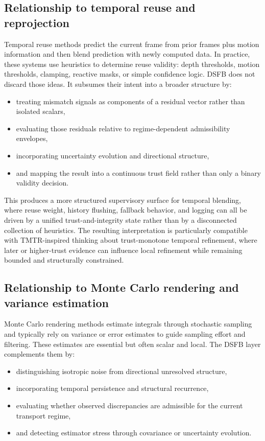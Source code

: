 \documentclass[11pt]{article}
\theoremstyle{definition}
\theoremstyle{plain}
\begin{document}

\subsection{Relationship to temporal reuse and reprojection}

Temporal reuse methods predict the current frame from prior frames plus motion information and then blend prediction with newly computed data. In practice, these systems use heuristics to determine reuse validity: depth thresholds, motion thresholds, clamping, reactive masks, or simple confidence logic. DSFB does not discard those ideas. It subsumes their intent into a broader structure by:
\begin{itemize}[leftmargin=1.5em]
    \item treating mismatch signals as components of a residual vector rather than isolated scalars,
    \item evaluating those residuals relative to regime-dependent admissibility envelopes,
    \item incorporating uncertainty evolution and directional structure,
    \item and mapping the result into a continuous trust field rather than only a binary validity decision.
\end{itemize}

This produces a more structured supervisory surface for temporal blending, where reuse weight, history flushing, fallback behavior, and logging can all be driven by a unified trust-and-integrity state rather than by a disconnected collection of heuristics. The resulting interpretation is particularly compatible with TMTR-inspired thinking about trust-monotone temporal refinement, where later or higher-trust evidence can influence local refinement while remaining bounded and structurally constrained. 


\subsection{Relationship to Monte Carlo rendering and variance estimation}

Monte Carlo rendering methods estimate integrals through stochastic sampling and typically rely on variance or error estimates to guide sampling effort and filtering. These estimates are essential but often scalar and local. The DSFB layer complements them by:
\begin{itemize}[leftmargin=1.5em]
    \item distinguishing isotropic noise from directional unresolved structure,
    \item incorporating temporal persistence and structural recurrence,
    \item evaluating whether observed discrepancies are admissible for the current transport regime,
    \item and detecting estimator stress through covariance or uncertainty evolution.
\end{itemize}
\end{document}
